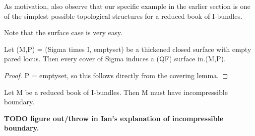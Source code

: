 As motivation, also observe that our specific example in the earlier section is
one of the simplest possible topological structures for a reduced book of
I-bundles.

Note that the surface case is very easy.

\begin{prop}

Let (M,P) = (Sigma times I, emptyset) be a thickened closed surface with empty
pared locus. Then every cover of Sigma induces a (QF) surface in.(M,P).

\end{prop}

\begin{proof}

P = emptyset, so this follows directly from the covering lemma.

\end{proof}

\begin{prop}

Let M be a reduced book of I-bundles. Then M must have incompressible boundary.


\end{prop}

\textbf{TODO figure out/throw in Ian's explanation of incompressible boundary.}

